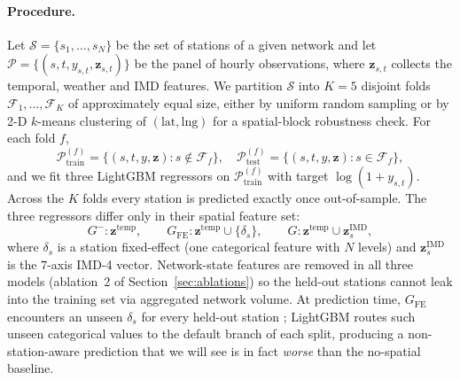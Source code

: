 \documentclass[11pt,a4paper]{article}
\begin{document}
\paragraph{Procedure.}
Let $\mathcal{S} = \{s_1, \dots, s_N\}$ be the set of stations
of a given network and let
$\mathcal{P} = \{(s, t, y_{s,t}, \mathbf{z}_{s,t})\}$ be the
panel of hourly observations, where $\mathbf{z}_{s,t}$ collects
the temporal, weather and IMD features.  We partition
$\mathcal{S}$ into $K = 5$ disjoint folds
$\mathcal{F}_1, \dots, \mathcal{F}_K$ of approximately equal
size, either by uniform random sampling or by 2-D $k$-means
clustering of $(\mathrm{lat}, \mathrm{lng})$ for a
spatial-block robustness check.  For each fold $f$,
\begin{equation}
    \mathcal{P}_{\mathrm{train}}^{(f)} = \{ (s, t, y, \mathbf{z}) : s \notin \mathcal{F}_f \},
    \quad
    \mathcal{P}_{\mathrm{test}}^{(f)}  = \{ (s, t, y, \mathbf{z}) : s \in \mathcal{F}_f \},
    \label{eq:lso-folds}
\end{equation}
and we fit three LightGBM regressors on
$\mathcal{P}_{\mathrm{train}}^{(f)}$ with target
$\log(1 + y_{s,t})$.  Across the $K$ folds every station is
predicted exactly once out-of-sample.  The three regressors
differ only in their spatial feature set:
\[
    G^{-} : \mathbf{z}^{\mathrm{temp}},
    \qquad
    G_{\mathrm{FE}} : \mathbf{z}^{\mathrm{temp}} \cup \{ \delta_s \},
    \qquad
    G : \mathbf{z}^{\mathrm{temp}} \cup \mathbf{z}^{\mathrm{IMD}}_s,
\]
where $\delta_s$ is a station fixed-effect (one categorical
feature with $N$ levels) and $\mathbf{z}^{\mathrm{IMD}}_s$ is
the $7$-axis IMD-4 vector.  Network-state features are removed
in all three models (ablation~2 of
Section~\ref{sec:ablations}) so the held-out stations cannot
leak into the training set via aggregated network volume.  At
prediction time, $G_{\mathrm{FE}}$ encounters an unseen
$\delta_s$ for every held-out station ; LightGBM routes such
unseen categorical values to the default branch of each split,
producing a non-station-aware prediction that we will see is
in fact \emph{worse} than the no-spatial baseline.
\end{document}
